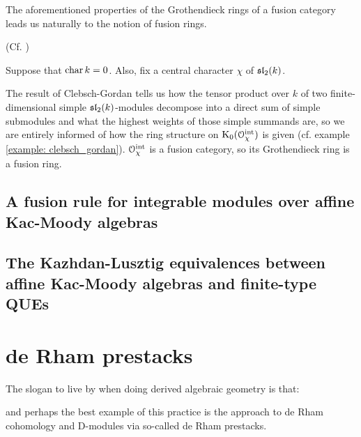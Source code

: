             The aforementioned properties of the Grothendieck rings of a fusion category leads us naturally to the notion of fusion rings.
            \begin{definition}
                (Cf. \cite[Subsection 3.1]{EGNO})
            \end{definition}
            \begin{example}
                Suppose that $\chara k = 0$. Also, fix a central character $\chi$ of $\sl_2(k)$.
            
                The result of Clebsch-Gordan tells us how the tensor product over $k$ of two finite-dimensional simple $\sl_2(k)$-modules decompose into a direct sum of simple submodules and what the highest weights of those simple summands are, so we are entirely informed of how the ring structure on $\K_0(\calO_{\chi}^{\integrable})$ is given (cf. example \ref{example: clebsch_gordan}). $\calO_{\chi}^{\integrable}$ is a fusion category, so its Grothendieck ring is a fusion ring.
                
            \end{example}

        \subsection{A fusion rule for integrable modules over affine Kac-Moody algebras}

        \subsection{The Kazhdan-Lusztig equivalences between affine Kac-Moody algebras and finite-type QUEs}

    \section{de Rham prestacks}
        The slogan to live by when doing derived algebraic geometry is that:
        \begin{center}
            \textit{}
        \end{center}
        and perhaps the best example of this practice is the approach to de Rham cohomology and D-modules via so-called de Rham prestacks.

